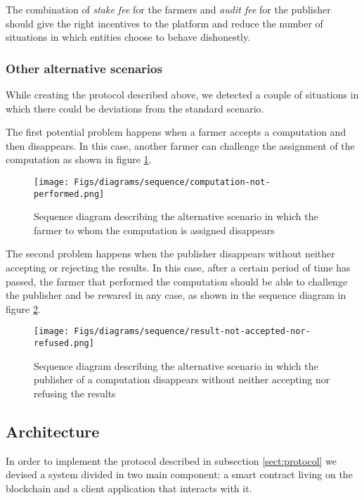 The combination of \emph{stake fee} for the farmers and \emph{audit fee} for the publisher should give the right incentives to the platform and reduce the number of situations in which entities choose to behave dishonestly.

\subsubsection{Other alternative scenarios}
While creating the protocol described above, we detected a couple of situations in which there could be deviations from the standard scenario.

The first potential problem happens when a farmer accepts a computation and then disappears. In this case, another farmer can challenge the assignment of the computation as shown in figure \ref{figs:sequence-computation-not-performed}.
\begin{figure}
\caption[Computation not performed scenario]{Sequence diagram describing the alternative scenario in which the farmer to whom the computation is assigned disappears}
\label{figs:sequence-computation-not-performed}
\begin{center}
    \texttt{[image: Figs/diagrams/sequence/computation-not-performed.png]}
\end{center}
\end{figure}

The second problem happens when the publisher disappears without neither accepting or rejecting the results. In this case, after a certain period of time has passed, the farmer that performed the computation should be able to challenge the publisher and be rewared in any case, as shown in the sequence diagram in figure \ref{figs:sequence-publisher-disappears}.
\begin{figure}
\caption[Computation result not accepted nor refused scenario]{Sequence diagram describing the alternative scenario in which the publisher of a computation disappears without neither accepting nor refusing the results}
\label{figs:sequence-publisher-disappears}
\begin{center}
    \texttt{[image: Figs/diagrams/sequence/result-not-accepted-nor-refused.png]}
\end{center}
\end{figure}

\subsection{Architecture}
In order to implement the protocol described in subsection \ref{sect:protocol} we devised a system divided in two main component: a smart contract living on the blockchain and a client application that interacts with it.

